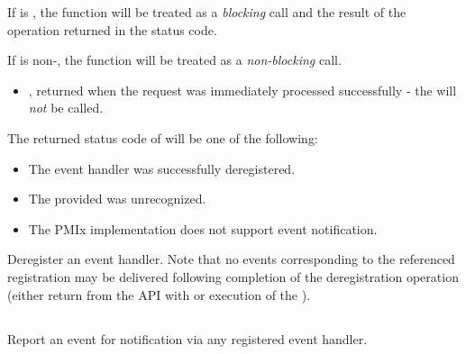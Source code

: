 \begin{arglist}
\end{arglist}

If  is , the function will be treated as a \emph{blocking} call and the result of the operation returned in the status code.

If  is non-, the function will be treated as a \emph{non-blocking} call.

\returnsimplenb

\begin{itemize}
\item {}, returned when the request was immediately processed successfully - the  will \textit{not} be called.
\end{itemize}

The returned status code of  will be one of the following:

\begin{itemize}
\item {} The event handler was successfully deregistered.
\item {} The provided  was unrecognized.
\item {} The \ac{PMIx} implementation does not support event notification.
\end{itemize}

\descr

Deregister an event handler. Note that no events corresponding to the referenced registration may be delivered following completion of the deregistration operation (either return from the \ac{API} with  or execution of the ).

\subsection{}

\summary

Report an event for notification via any
registered event handler.

